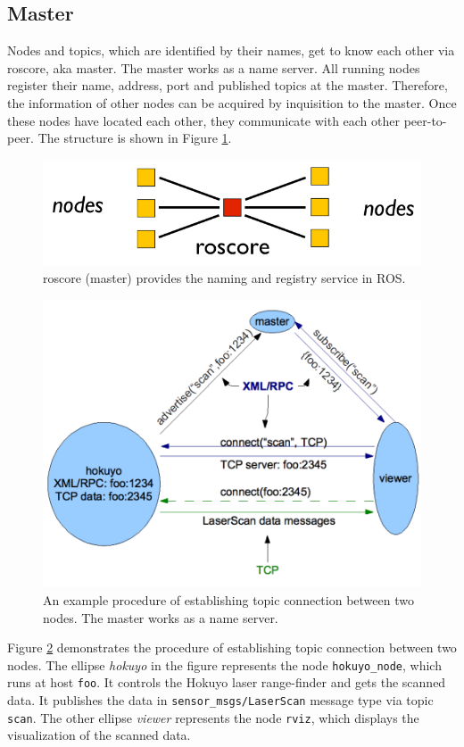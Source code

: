 \documentclass[a4paper, 10pt, conference]{ieeeconf}       %
\begin{document}
\subsection{Master}

Nodes and topics, which are identified by their names, get to know each other via roscore, aka master. The master works as a name server. All running nodes register their name, address, port and published topics at the master. Therefore, the information of other nodes can be acquired by inquisition to the master. Once these nodes have located each other, they communicate with each other peer-to-peer. The structure is shown in Figure \ref{fig:nodes}.

\begin{figure}[htpb]
  \centering
  \includegraphics[width=.4\textwidth]{nodes}
  \caption{roscore (master) provides the naming and registry service in ROS.}
  \label{fig:nodes}
\end{figure}

\begin{figure}[htpb]
  \centering
  \includegraphics[width=.48\textwidth]{master-node-example}
  \caption{An example procedure of establishing topic connection between two nodes. The master works as a name server.}
  \label{fig:master}
\end{figure}

Figure \ref{fig:master} demonstrates the procedure of establishing topic connection between two nodes. The ellipse \emph{hokuyo} in the figure represents the node \texttt{hokuyo\_node}, which runs at host \texttt{foo}. It controls the Hokuyo laser range-finder and gets the scanned data. It publishes the data in \texttt{sensor\_msgs/LaserScan} message type via topic \texttt{scan}. The other ellipse \emph{viewer} represents the node \texttt{rviz}, which displays the visualization of the scanned data.
\end{document}
